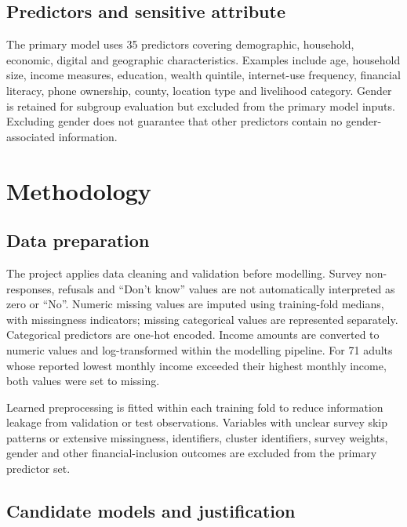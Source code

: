 \documentclass[11pt,a4paper]{article}
\begin{document}
\subsection{Predictors and sensitive attribute}

The primary model uses 35 predictors covering demographic, household, economic, digital and geographic characteristics. Examples include age, household size, income measures, education, wealth quintile, internet-use frequency, financial literacy, phone ownership, county, location type and livelihood category. Gender is retained for subgroup evaluation but excluded from the primary model inputs. Excluding gender does not guarantee that other predictors contain no gender-associated information.

\section{Methodology}

\subsection{Data preparation}

The project applies data cleaning and validation before modelling. Survey non-responses, refusals and ``Don't know'' values are not automatically interpreted as zero or ``No''. Numeric missing values are imputed using training-fold medians, with missingness indicators; missing categorical values are represented separately. Categorical predictors are one-hot encoded. Income amounts are converted to numeric values and log-transformed within the modelling pipeline. For 71 adults whose reported lowest monthly income exceeded their highest monthly income, both values were set to missing.

Learned preprocessing is fitted within each training fold to reduce information leakage from validation or test observations. Variables with unclear survey skip patterns or extensive missingness, identifiers, cluster identifiers, survey weights, gender and other financial-inclusion outcomes are excluded from the primary predictor set.

\subsection{Candidate models and justification}
\end{document}
